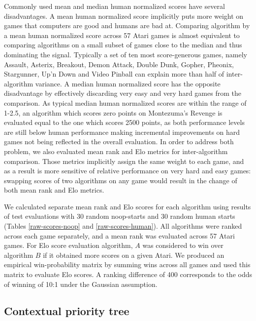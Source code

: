 \documentclass{article}
\begin{document}
Commonly used mean and median human normalized scores have several 
disadvantages. A mean human normalized score implicitly puts more weight on 
games that computers are good and humans are bad at. Comparing algorithm by a 
mean human normalized score across 57 Atari games is almost equivalent to 
comparing algorithms on a small subset of games close to the median 
and thus dominating the signal.
Typically a set of ten most score-generous games, namely Assault, Asterix, 
Breakout, Demon Attack, Double Dunk, Gopher, Pheonix, Stargunner, Up'n Down and 
Video Pinball can explain more than half of inter-algorithm variance. A median 
human normalized score has the opposite disadvantage by effectively discarding 
very easy and very hard games from the comparison. As typical median human 
normalized scores are within the range of 1-2.5, an algorithm which scores zero 
points on Montezuma's Revenge is evaluated equal to the one which scores 2500 
points, as both performance levels are still below human performance making 
incremental improvements on hard games not being reflected in the overall 
evaluation. In order to address both problem, we also evaluated mean rank and 
Elo metrics for inter-algorithm comparison. Those metrics implicitly assign the 
same weight to each game, and as a result is more sensitive of relative 
performance on very 
hard and easy games: swapping scores of two algorithms on any game would 
result in the change of both mean rank and Elo metrics.

We calculated separate mean rank and Elo scores for each algorithm using 
results of test evaluations with 30 random noop-starts and 30 random human 
starts (Tables \ref{raw-scores-noop} and \ref{raw-scores-human}).
All algorithms were ranked across each game separately, and a mean rank 
was evaluated across 57 Atari games. For Elo score 
evaluation algorithm, $A$ was considered to win over algorithm $B$ if 
it obtained more scores on a given Atari. We produced an empirical 
win-probability matrix by summing wins across all games and used this matrix to 
evaluate Elo scores. A ranking difference of 400 corresponds to the odds 
of winning of 10:1 under the Gaussian assumption.

\subsection{Contextual priority tree}
\label{app-tree-prioritized}
\end{document}
